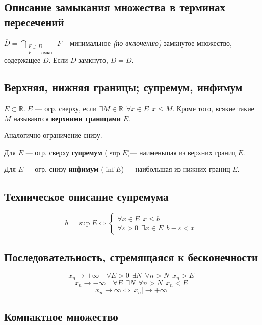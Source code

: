 \subsection{Описание замыкания множества в терминах пересечений}

$\overline D = \bigcap\limits_{\substack{F\supset D \\ F \text{ --- замкн.}}} F$ -- минимальное \textit{(по включению)} замкнутое множество, содержащее $D$. Если $D$ замкнуто, $\overline D=D$.

\subsection{Верхняя, нижняя границы; супремум, инфимум}

$E\subset \mathbb{R}$. $E$ --- огр. сверху, если $\exists M\in\mathbb{R} \ \ \forall x\in E \ \ x\leq M$. Кроме того, всякие такие $M$ называются {\bf верхними границами} $E$.

Аналогично ограничение снизу.

Для $E$ --- огр. сверху {\bf супремум} ($\sup E$)--- наименьшая из верхних границ $E$.

Для $E$ --- огр. снизу {\bf инфимум} ($\inf E$) --- наибольшая из нижних границ $E$.

\subsection{Техническое описание супремума}

$$b=\sup E \Leftrightarrow \begin{cases}
    \forall x\in E \ \ x\leq b \\
    \forall \varepsilon > 0 \ \ \exists x\in E \ \ b-\varepsilon<x
\end{cases}$$

\subsection{Последовательность, стремящаяся к бесконечности}

$$x_n\to +\infty \quad \forall E>0 \ \ \exists N \ \ \forall n>N \ \ x_n>E$$
$$x_n\to -\infty \quad \forall E \ \ \exists N \ \ \forall n>N \ \ x_n<E$$
$$x_n\to \infty \Leftrightarrow |x_n|\to +\infty$$

\subsection{Компактное множество}

